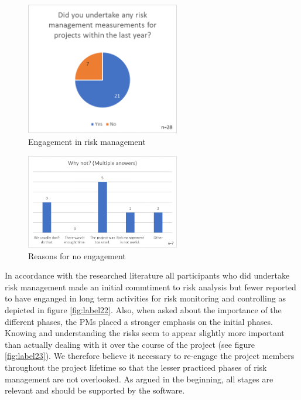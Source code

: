 \begin{figure}[H]
	\centering
	\includegraphics[width=0.6\textwidth]{Assets/survey_results/Q1.png}
	\caption{Engagement in risk management}
	\label{fig:label20}
\end{figure}
\begin{figure}[H]
	\centering
	\includegraphics[width=0.6\textwidth]{Assets/survey_results/Q2.png}
	\caption{Reasons for no engagement}
	\label{fig:label21}
\end{figure}

In accordance with the researched literature all participants who did undertake risk management made an initial commtiment to risk analysis but fewer reported to have enganged in long term activities for risk monitoring and controlling as depicted in figure \ref{fig:label22}. Also, when asked about the importance of the different phases, the PMs placed a stronger emphasis on the initial phases. Knowing and understanding the risks seem to appear slightly more important than actually dealing with it over the course of the project (see figure \ref{fig:label23}).  We therefore believe it necessary to re-engage the project members throughout the project lifetime so that the lesser practiced phases of risk management are not overlooked. As argued in the beginning, all stages are relevant and should be supported by the software.
 
